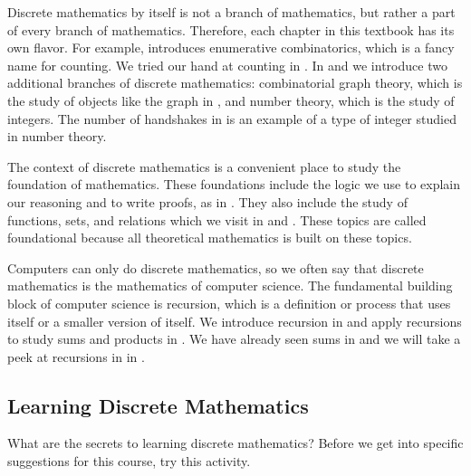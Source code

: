 Discrete mathematics by itself is not a branch of mathematics, but rather a part of every branch of mathematics. Therefore, each chapter in this textbook has its own flavor.  For example,  {\chcounting} introduces enumerative combinatorics, which is a fancy name for counting. We tried our hand at counting in . In  {\chgraphthy} and  {\chnothy} we introduce two additional branches of discrete mathematics: combinatorial graph theory, which is the study of objects like the graph in , and number theory, which is the study of integers.  The number of handshakes in  is an example of a type of integer studied in number theory.

The context of discrete mathematics is a convenient place to study the foundation of mathematics.  These foundations include the logic we use to explain our reasoning and to write proofs, as in  {\chlogic}.  They also include the study of functions, sets, and relations which we visit in  {\chfn} and  {\chsetrel}.  These topics are called foundational because all theoretical mathematics is built on these topics.

Computers can only do discrete mathematics, so we often say that discrete mathematics is the mathematics of computer science. The fundamental building block of computer science is recursion, which is a definition or process that uses itself or a smaller version of itself.  We introduce recursion in  {\chrecind} and apply recursions to study sums and products in  {\chsumprod}.  We have already seen sums in  and we will take a peek at recursions in  in .

\newcommand{\sublearning}{Learning Discrete Mathematics}
\subsection{\sublearning}
\label{sub_learning}

What are the secrets to learning discrete mathematics? Before we get into specific suggestions for this course, try this activity.

